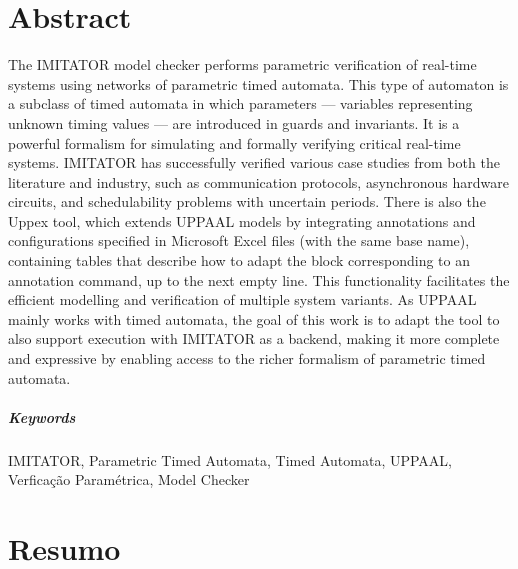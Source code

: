 \chapter*{Abstract}

The IMITATOR model checker performs parametric verification of real-time systems using networks of parametric timed automata. This type of automaton is a subclass of timed automata in which parameters — variables representing unknown timing values — are introduced in guards and invariants. It is a powerful formalism for simulating and formally verifying critical real-time systems. IMITATOR has successfully verified various case studies from both the literature and industry, such as communication protocols, asynchronous hardware circuits, and schedulability problems with uncertain periods. There is also the Uppex tool, which extends UPPAAL models by integrating annotations and configurations specified in Microsoft Excel files (with the same base name), containing tables that describe how to adapt the block corresponding to an annotation command, up to the next empty line. This functionality facilitates the efficient modelling and verification of multiple system variants. As UPPAAL mainly works with timed automata, the goal of this work is to adapt the tool to also support execution with IMITATOR as a backend, making it more complete and expressive by enabling access to the richer formalism of parametric timed automata.

\paragraph{Keywords} IMITATOR, Parametric Timed Automata, Timed Automata, UPPAAL, Verficação Paramétrica, Model Checker 

\cleardoublepage

\chapter*{Resumo}

